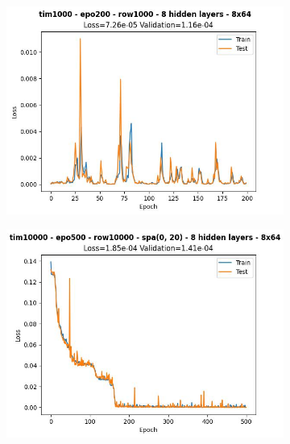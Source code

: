 \begin{figure}[H]
    \centering
    \begin{subfigure}{.47\linewidth}
        \centering
        \includegraphics[width=\textwidth]{other-models/2024-05-20T21:59:10.702061_pendulum_tim1000_epo200_row1000.jpg}
    \end{subfigure}
    \begin{subfigure}{.47\linewidth}
        \centering
        \includegraphics[width=\textwidth]{other-models/2024-05-20T23:10:14.435499_pendulum_tim10000_epo500_row10000_spa(0, 20).jpg}
    \end{subfigure}
    \begin{subfigure}{.47\linewidth}
        \centering

\end{subfigure}
\end{figure}
